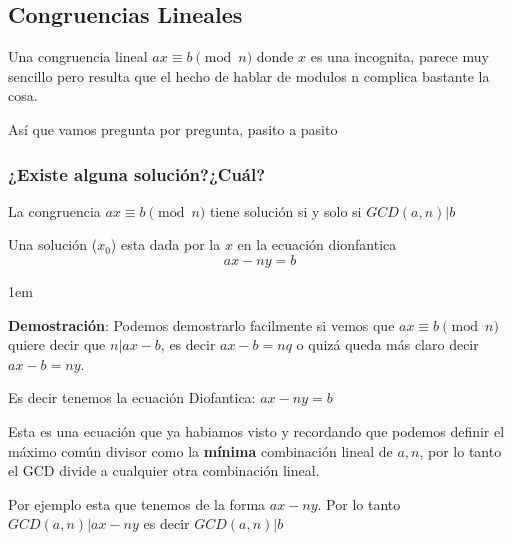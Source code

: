 \documentclass[12pt, fleqn]{report}                             %
\newenvironment{SmallIndentation}[1][0.75em]                    %
    {\begin{adjustwidth}{#1}{}\begin{footnotesize}}                 %
    {\end{footnotesize}\end{adjustwidth}}                           %
\begin{document}
        \subsection{Congruencias Lineales}


            Una congruencia lineal $ax \equiv b \pmod{n}$ donde $x$ es una incognita,
            parece muy sencillo pero resulta que el hecho de hablar de modulos n complica
            bastante la cosa.

            Así que vamos pregunta por pregunta, pasito a pasito

            \subsubsection{¿Existe alguna solución?¿Cuál?}
                La congruencia $ax \equiv b \pmod{n}$ tiene solución si y solo si 
                $GCD(a, n) | b$

                Una solución ($x_0$) esta dada por la $x$ en la ecuación 
                dionfantica
                \begin{equation*}
                    ax - ny = b
                \end{equation*}

                \begin{SmallIndentation}[1em]
                    \textbf{Demostración}:
                    Podemos demostrarlo facilmente si vemos que $ax \equiv b \pmod{n}$
                    quiere decir que $n|ax -b$, es decir $ax-b=nq$ o quizá queda más
                    claro decir $ax - b = ny$.

                    Es decir tenemos la ecuación Diofantica: $ax - ny = b$ 
 
                    Esta es una ecuación que ya habiamos visto y recordando que podemos definir
                    el máximo común divisor como la \textbf{mínima} combinación lineal de
                    $a, n$, por lo tanto el GCD divide a cualquier otra combinación lineal.

                    Por ejemplo esta que tenemos de la forma $ax - ny$.
                    Por lo tanto $GCD(a, n)| ax - ny$ es decir $GCD(a, n)|b$
                \end{SmallIndentation}
\end{document}
